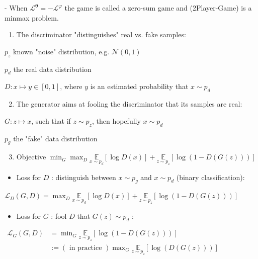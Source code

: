 - When $\mathcal{L}^{\boldsymbol{\theta}}=-\mathcal{L}^{\varphi}$ the game is called a zero-sum game and (2Player-Game) is a minmax problem.

\begin{enumerate}
  \item The discriminator "distinguishes" real vs. fake samples:
\end{enumerate}

$p_{z}$ known "noise" distribution, e.g. $\mathcal{N}(0,1)$

$p_{d}$ the real data distribution

$D: x \mapsto y \in[0,1]$, where $y$ is an estimated probability that $x \sim p_{d}$

\begin{enumerate}
  \setcounter{enumi}{1}
  \item The generator aims at fooling the discriminator that its samples are real:
\end{enumerate}

$G: z \mapsto x$, such that if $z \sim p_{z}$, then hopefully $x \sim p_{d}$

$p_{g}$ the "fake" data distribution

\begin{enumerate}
  \setcounter{enumi}{2}
  \item Objective
  $
  \min _{G} \max _{D} \underset{x \sim p_{d}}{\mathbb{E}}[\log D(x)]+\underset{z \sim p_{z}}{\mathbb{E}}[\log (1-D(G(z)))]
  $
\end{enumerate}



\begin{itemize}
  \item Loss for $D$ : distinguish between $x \sim p_{g}$ and $x \sim p_{d}$ (binary classification):
\end{itemize}

$\mathscr{L}_{D}(G, D)=\max _{D} \underset{x \sim p_{d}}{\mathbb{E}}[\log D(x)]+\underset{z \sim p_{z}}{\mathbb{E}}[\log (1-D(G(z)))]$

\begin{itemize}
  \item Loss for $G$ : fool $D$ that $G(z) \sim p_{d}$ :
\end{itemize}

$
\begin{aligned}
\mathscr{L}_{G}(G, D) & =\min _{G} \underset{z \sim p_{z}}{\mathbb{E}}[\log (1-D(G(z)))] \\
& :=(\text { in practice }) \max _{G} \underset{z \sim p_{z}}{\mathbb{E}}[\log (D(G(z)))]
\end{aligned}
$

